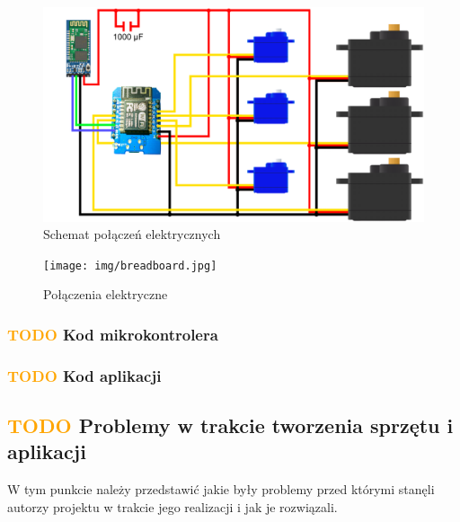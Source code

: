 \documentclass[11pt,titlepage,a4paper]{article}
\begin{document}
\vspace{5cm}

\begin{figure}[h!]
    \begin{center}
        \includegraphics[width=\textwidth]{img/schemat.png}
    \end{center}
    \caption{Schemat połączeń elektrycznych}
    \vspace{5cm}
    \label{SchematElektryczny}
\end{figure}

\begin{figure}[h!]
    \begin{center}
        \texttt{[image: img/breadboard.jpg]}
    \end{center}
    \caption{Połączenia elektryczne}
    \label{Breadboard}
\end{figure}

\subsubsection{\textcolor{orange}{TODO} Kod mikrokontrolera}
\subsubsection{\textcolor{orange}{TODO} Kod aplikacji}

\subsection{\textcolor{orange}{TODO} Problemy w trakcie tworzenia sprzętu i aplikacji}

W tym punkcie należy przedstawić jakie były problemy przed którymi stanęli autorzy projektu w trakcie jego realizacji i jak je rozwiązali.

\newpage
\end{document}
